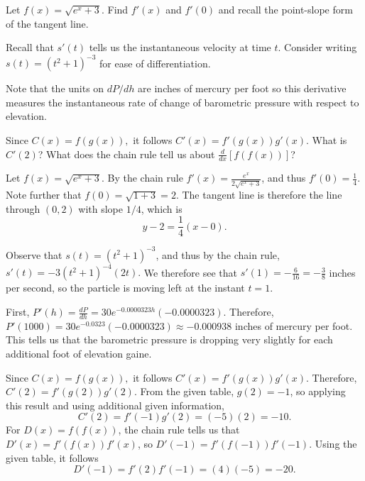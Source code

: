 \begin{bighint}
\ba
	\item Let $f(x) = \sqrt{e^x + 3}.$ Find $f'(x)$ and $f'(0)$ and recall the point-slope form of the tangent line.
  	\item Recall that $s'(t)$ tells us the instantaneous velocity at time $t$.  Consider writing $s(t) = (t^2 + 1)^{-3}$ for ease of differentiation.
  	\item Note that the units on $dP/dh$ are inches of mercury per foot so this derivative measures the instantaneous rate of change of barometric pressure with respect to elevation.  
  	\item Since $C(x) = f(g(x)),$ it follows $C'(x) = f'(g(x))g'(x).$  What is $C'(2)$?  What does the chain rule tell us about $\frac{d}{dx}[f(f(x))]$?
\ea
\end{bighint}
\begin{activitySolution}
\ba
	\item Let $f(x) = \sqrt{e^x + 3}.$ By the chain rule $f'(x) = \frac{e^x}{2\sqrt{e^x + 3}}$, and thus $f'(0) = \frac{1}{4}$.  Note further that $f(0) = \sqrt{1 + 3} = 2$.  The tangent line is therefore the line through $(0,2)$ with slope $1/4$, which is
	$$y - 2 = \frac{1}{4}(x-0).$$
  	\item Observe that $s(t) = (t^2 + 1)^{-3}$, and thus by the chain rule, $s'(t) = -3(t^2 + 1)^{-4}(2t).$  We therefore see that $s'(1) = -\frac{6}{16} = -\frac{3}{8}$ inches per second, so the particle is moving left at the instant $t = 1$.
  	\item First, $P'(h) = \frac{dP}{dh} = 30 e^{-0.0000323h} (-0.0000323).$  Therefore, $P'(1000) = 30 e^{-0.0323} (-0.0000323) \approx -0.000938$ inches of mercury per foot.  This tells us that the barometric pressure is dropping very slightly for each additional foot of elevation gaine.
	  
  	\item Since $C(x) = f(g(x)),$ it follows $C'(x) = f'(g(x))g'(x).$  Therefore, $C'(2) = f'(g(2))g'(2)$.  From the given table, $g(2) = -1$, so applying this result and using additional given information,
	$$C'(2) = f'(-1) g'(2) = (-5)(2) = -10.$$  
	For $D(x) = f(f(x))$, the chain rule tells us that $D'(x) = f'(f(x))f'(x)$, so $D'(-1) = f'(f(-1))f'(-1)$.  Using the given table, it follows
	$$D'(-1) = f'(2)f'(-1) = (4)(-5) = -20.$$ 
\ea
\end{activitySolution}
\aftera